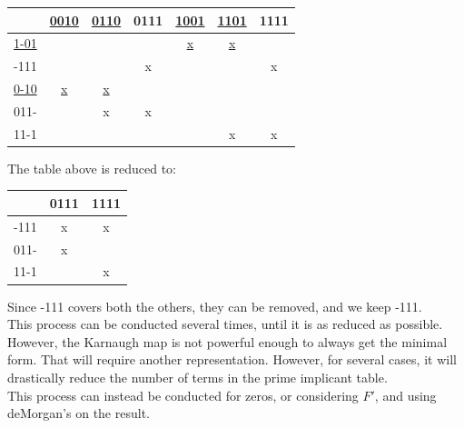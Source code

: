 \documentclass[nobib]{tufte-handout}
\begin{document}
    \begin{center}
        \begin{table}
            \centering
            \begin{tabular}{c|c c c c c c}
                                 & \underline{0010} & \underline{0110} & 0111 & \underline{1001} & \underline{1101} & 1111 \\
                \hline
                \underline{1-01} &                  &                  &      & \underline{x}    & \underline{x}    &      \\
                -111             &                  &                  & x    &                  &                  & x    \\
                \underline{0-10} & \underline{x }   & \underline{x}    &      &                  &                  &      \\
                011-             &                  & x                & x    &                  &                  &      \\
                11-1             &                  &                  &      &                  & x                & x    \\
            \end{tabular}
        \end{table}
    \end{center}
    \pagebreak
    The table above is reduced to:\\
    \begin{center}
        \begin{table}
            \centering
            \begin{tabular}{c| c c}
                     & 0111 & 1111 \\
                \hline
                -111 & x    & x    \\
                011- & x    &      \\
                11-1 &      & x    \\
            \end{tabular}
        \end{table}
    \end{center}
    Since -111 covers both the others, they can be removed, and we keep -111.\\
    This process can be conducted several times, until it is as reduced as possible. However, the Karnaugh map is not powerful enough to always get the minimal form. That will require another representation. However, for several cases, it will drastically reduce the number of terms in the prime implicant table.\\
    This process can instead be conducted for zeros, or considering $F'$, and using deMorgan's on the result.
\end{document}
